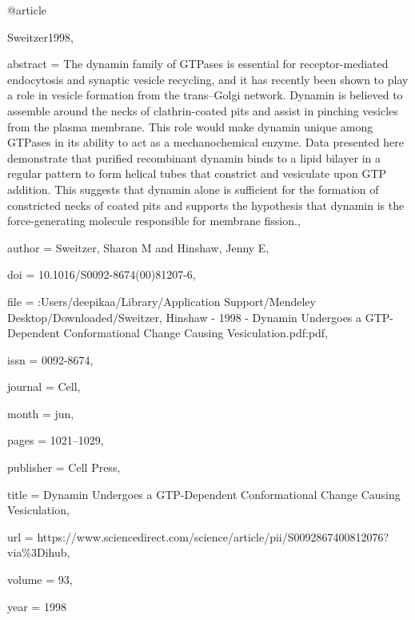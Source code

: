 @article{Sweitzer1998,

abstract = {The dynamin family of GTPases is essential for receptor-mediated endocytosis and synaptic vesicle recycling, and it has recently been shown to play a role in vesicle formation from the trans–Golgi network. Dynamin is believed to assemble around the necks of clathrin-coated pits and assist in pinching vesicles from the plasma membrane. This role would make dynamin unique among GTPases in its ability to act as a mechanochemical enzyme. Data presented here demonstrate that purified recombinant dynamin binds to a lipid bilayer in a regular pattern to form helical tubes that constrict and vesiculate upon GTP addition. This suggests that dynamin alone is sufficient for the formation of constricted necks of coated pits and supports the hypothesis that dynamin is the force-generating molecule responsible for membrane fission.},

author = {Sweitzer, Sharon M and Hinshaw, Jenny E},

doi = {10.1016/S0092-8674(00)81207-6},

file = {:Users/deepikaa/Library/Application Support/Mendeley Desktop/Downloaded/Sweitzer, Hinshaw - 1998 - Dynamin Undergoes a GTP-Dependent Conformational Change Causing Vesiculation.pdf:pdf},

issn = {0092-8674},

journal = {Cell},

month = {jun},

pages = {1021--1029},

publisher = {Cell Press},

title = {{Dynamin Undergoes a GTP-Dependent Conformational Change Causing Vesiculation}},

url = {https://www.sciencedirect.com/science/article/pii/S0092867400812076?via{\%}3Dihub},

volume = {93},

year = {1998}

}

